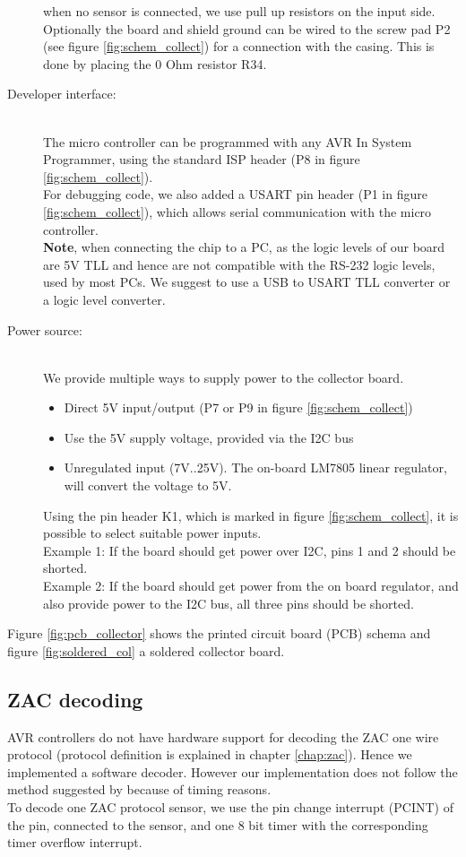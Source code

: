 \documentclass[a4paper]{scrreprt}
\begin{document}
\begin{description}
    when no sensor is connected, we use pull up resistors on the
    input side. Optionally the board and shield ground can be wired to
    the screw pad P2 (see figure \ref{fig:schem_collect}) for a connection with the casing. This is done by
    placing the 0 Ohm resistor R34.
  \item[Developer interface:]\hspace{1cm}\\
    The micro controller can be programmed with any AVR In System
    Programmer, using the standard ISP header (P8 in figure \ref{fig:schem_collect}).\\
    For debugging code, we also added a USART pin header (P1 in figure \ref{fig:schem_collect}), which
    allows serial communication with the micro controller. 
    \\
    \textbf{Note}, when connecting the chip to a PC, as the logic
    levels of our board are 5V TLL and hence are not compatible
    with the RS-232 logic levels, used by most PCs. We suggest to use
    a USB to USART TLL converter or a logic level converter.
  \item[Power source:]\hspace{1cm}\\
    We provide multiple ways to supply power to the collector board.
    \begin{itemize}
      \item Direct 5V input/output (P7 or P9 in figure \ref{fig:schem_collect})
      \item Use the 5V supply voltage, provided via the I2C bus
      \item Unregulated input (7V..25V). The on-board LM7805 linear
        regulator, will convert the voltage to 5V.
    \end{itemize}
    Using the pin header K1, which is marked in figure \ref{fig:schem_collect}, it is possible to select suitable
    power inputs.\\
    Example 1: If the board should get power over I2C, pins 1 and 2
    should be shorted.\\
    Example 2: If the board should get power from the on board
    regulator, and also provide power to the I2C bus, all three pins
    should be shorted.
\end{description}
Figure \ref{fig:pcb_collector} shows the printed circuit board (PCB) schema and figure \ref{fig:soldered_col} a soldered collector board.
\subsection{ZAC decoding}
AVR controllers do not have hardware support for decoding the ZAC one wire
protocol (protocol definition is explained in chapter \ref{chap:zac}). Hence we
implemented a software decoder. However our implementation
does not follow the method suggested by \cite{zac} because of timing reasons.\\
To decode one ZAC protocol sensor, we use the pin change interrupt (PCINT) of the pin, connected to the sensor, and
one 8 bit timer with the corresponding timer overflow interrupt.
\end{document}
